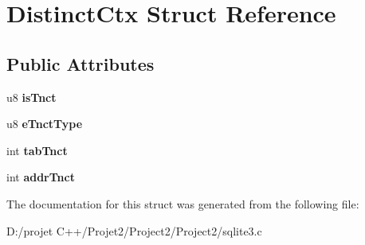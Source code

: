 \hypertarget{struct_distinct_ctx}{}\section{Distinct\+Ctx Struct Reference}
\label{struct_distinct_ctx}
\subsection*{Public Attributes}
\begin{DoxyCompactItemize}
\item 
\mbox{\label{struct_distinct_ctx_aaaa3b23ad86358ba11b4da77cd753bbd}} 
u8 {\bfseries is\+Tnct}
\item 
\mbox{\label{struct_distinct_ctx_ae57f819b64420f943f21d8d0e9c36205}} 
u8 {\bfseries e\+Tnct\+Type}
\item 
\mbox{\label{struct_distinct_ctx_af4514e425f99659e97b2bbe756716517}} 
int {\bfseries tab\+Tnct}
\item 
\mbox{\label{struct_distinct_ctx_a897fdd9a1025f3d6c438a5113cf925d2}} 
int {\bfseries addr\+Tnct}
\end{DoxyCompactItemize}


The documentation for this struct was generated from the following file\+:\begin{DoxyCompactItemize}
\item 
D\+:/projet C++/\+Projet2/\+Project2/\+Project2/sqlite3.\+c\end{DoxyCompactItemize}
